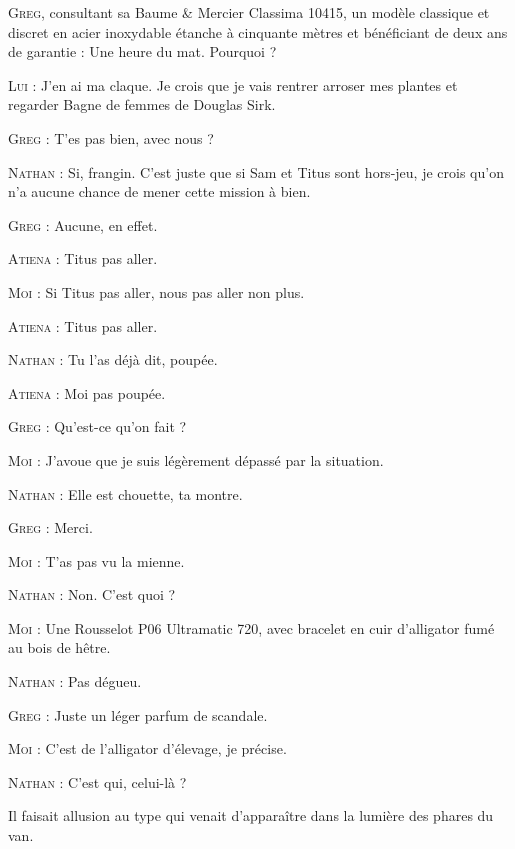 \begin{dialogue}
\textsc{Greg}, consultant sa Baume \& Mercier Classima 10415, un modèle classique et discret en acier inoxydable étanche à cinquante mètres et bénéficiant de deux ans de garantie : Une heure du mat. Pourquoi ?

\textsc{Lui} : J’en ai ma claque. Je crois que je vais rentrer arroser mes plantes et regarder Bagne de femmes de Douglas Sirk.

\textsc{Greg} : T’es pas bien, avec nous ?

\textsc{Nathan} : Si, frangin. C’est juste que si Sam et Titus sont hors-jeu, je crois qu’on n’a aucune chance de mener cette mission à bien.

\textsc{Greg} : Aucune, en effet.

\textsc{Atiena} : Titus pas aller.

\textsc{Moi} : Si Titus pas aller, nous pas aller non plus.

\textsc{Atiena} : Titus pas aller.

\textsc{Nathan} : Tu l’as déjà dit, poupée.

\textsc{Atiena} : Moi pas poupée.

\textsc{Greg} : Qu’est-ce qu’on fait ?

\textsc{Moi} : J’avoue que je suis légèrement dépassé par la situation.

\textsc{Nathan} : Elle est chouette, ta montre.

\textsc{Greg} : Merci.

\textsc{Moi} : T’as pas vu la mienne.

\textsc{Nathan} : Non. C’est quoi ?

\textsc{Moi} : Une Rousselot P06 Ultramatic 720, avec bracelet en cuir d’alligator fumé au bois de hêtre.

\textsc{Nathan} : Pas dégueu.

\textsc{Greg} : Juste un léger parfum de scandale.

\textsc{Moi} : C’est de l’alligator d’élevage, je précise.

\textsc{Nathan} : C’est qui, celui-là ?

\end{dialogue}

Il faisait allusion au type qui venait d’apparaître dans la lumière des phares du van.

